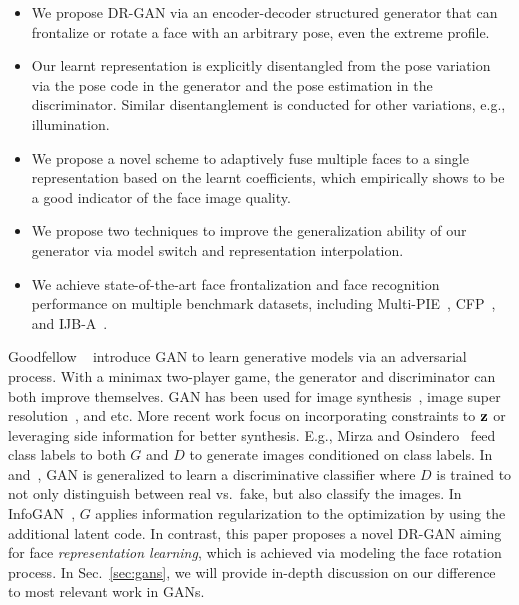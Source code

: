 \documentclass[10pt,journal,compsoc]{IEEEtran}
\begin{document}
\begin{itemize}
 \item We propose DR-GAN via an encoder-decoder structured generator that can frontalize or rotate a face with an arbitrary pose, even the extreme profile.

 \item Our learnt representation is explicitly disentangled from the pose variation via the pose code in the generator and the pose estimation in the discriminator. 
Similar disentanglement is conducted for other variations, e.g., illumination.

 \item We propose a novel scheme to adaptively fuse multiple faces to a single representation based on the learnt coefficients, which empirically shows to be a good indicator of the face image quality. 

 \item We propose two techniques to improve the generalization ability of our generator via model switch and representation interpolation. 

 \item We achieve state-of-the-art face frontalization and face recognition performance on multiple benchmark datasets, including Multi-PIE~\cite{gross2010multi}, CFP~\cite{sengupta2016frontal}, and IJB-A~\cite{klare2015pushing}.
\end{itemize}
Goodfellow \etal~\cite{goodfellow2014generative} introduce GAN to learn generative models via an adversarial process. 
With a minimax two-player game, the generator and discriminator can both improve themselves. 
GAN has been used for image synthesis~\cite{denton2015deep,reed2016generative}, image super resolution~\cite{yu2016ultra}, and etc. 
More recent work focus on incorporating constraints to $\bf{z}$ or leveraging side information for better synthesis. 
E.g., Mirza and Osindero~\cite{mirza2014conditional} feed class labels to both $G$ and $D$ to generate images conditioned on class labels. 
In~\cite{salimans2016improved} and~\cite{odena2016semi}, GAN is generalized to learn a discriminative classifier where $D$ is trained to not only distinguish between real vs.~fake, but also classify the images. 
In InfoGAN~\cite{chen2016infogan}, $G$ applies information regularization to the optimization by using the additional latent code. In contrast, this paper proposes a novel DR-GAN aiming for face {\it representation learning}, 
%
which is achieved via modeling the face rotation process. In Sec.~\ref{sec:gans}, we will provide in-depth discussion on our difference to most relevant work in GANs.
\end{document}
